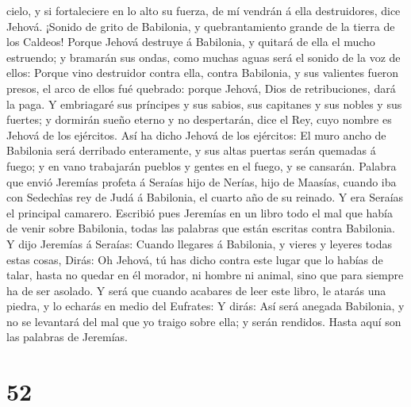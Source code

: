cielo, y si fortaleciere en lo alto su fuerza, de mí vendrán á ella
destruidores, dice Jehová.  ¡Sonido de grito de
Babilonia, y quebrantamiento grande de la tierra de los Caldeos!
 Porque Jehová destruye á Babilonia, y quitará de ella el
mucho estruendo; y bramarán sus ondas, como muchas aguas será el sonido
de la voz de ellos:  Porque vino destruidor contra ella,
contra Babilonia, y sus valientes fueron presos, el arco de ellos fué
quebrado: porque Jehová, Dios de retribuciones, dará la paga.
 Y embriagaré sus príncipes y sus sabios, sus capitanes y
sus nobles y sus fuertes; y dormirán sueño eterno y no despertarán, dice
el Rey, cuyo nombre es Jehová de los ejércitos.  Así ha
dicho Jehová de los ejércitos: El muro ancho de Babilonia será derribado
enteramente, y sus altas puertas serán quemadas á fuego; y en vano
trabajarán pueblos y gentes en el fuego, y se cansarán. 
Palabra que envió Jeremías profeta á Seraías hijo de Nerías, hijo de
Maasías, cuando iba con Sedechîas rey de Judá á Babilonia, el cuarto año
de su reinado. Y era Seraías el principal camarero. 
Escribió pues Jeremías en un libro todo el mal que había de venir sobre
Babilonia, todas las palabras que están escritas contra Babilonia.
 Y dijo Jeremías á Seraías: Cuando llegares á Babilonia,
y vieres y leyeres todas estas cosas,  Dirás: Oh Jehová,
tú has dicho contra este lugar que lo habías de talar, hasta no quedar
en él morador, ni hombre ni animal, sino que para siempre ha de ser
asolado.  Y será que cuando acabares de leer este libro,
le atarás una piedra, y lo echarás en medio del Eufrates:
 Y dirás: Así será anegada Babilonia, y no se levantará
del mal que yo traigo sobre ella; y serán rendidos. Hasta aquí son las
palabras de Jeremías.

\hypertarget{section-51}{%
\section{52}\label{section-51}}


